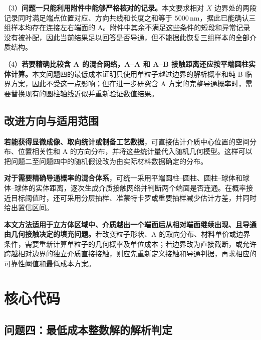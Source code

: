\documentclass[withoutpreface,bwprint]{cumcmthesis}
\begin{document}
（3）\textbf{问题一只能利用附件中能够严格核对的记录。}本文要求相对 $X$ 边界处的两段记录同时满足端点位置对应、方向共线和长度之和等于 $5000\,\mathrm{nm}$，据此已能确认三组样本均存在连接左右端面的 A。附件中其余不满足这些条件的短段和异常记录没有被补配，因此当前结果足以回答是否导通，但不能据此恢复三组样本的全部介质结构。

（4）\textbf{若要精确比较含 A 的混合网络，A--A 和 A--B 接触距离还应按平端圆柱实体计算。}本文问题四的最低成本证明只使用单粒子越过边界的解析概率和纯 B 临界方案，因此不受这一点影响；但在进一步研究含 A 方案的完整导通概率时，需要替换现有的圆柱轴线近似并重新验证数值结果。

\subsection{改进方向与适用范围}

\textbf{若能获得显微成像、取向统计或制备工艺数据}，可直接估计介质中心位置的空间分布、位置相关性和 A 的方向分布，并将这些统计量代入随机几何模型。这样可以把问题二至问题四中的随机假设改为由实际材料数据确定的分布。

\textbf{对于需要精确导通概率的混合体系}，可统一采用平端圆柱--圆柱、圆柱--球体和球体--球体的实体距离，逐次生成介质接触网络并判断两个端面是否连通。在概率接近目标阈值时，还可采用分层抽样、准蒙特卡罗或重要抽样减少估计方差，并同时给出置信区间。

\textbf{本文方法适用于立方体区域中、介质越出一个端面后从相对端面继续出现、且导通由几何接触决定的填充问题。}若改变粒子形状、A 的取向分布、材料单价或边界条件，需要重新计算单粒子的几何概率及单位成本；若边界改为直接截断，或允许跨越相对边界的独立介质直接接触，则应先重新定义接触和导通判据，再求相应的可靠性阈值和最低成本方案。




\appendix

\section{核心代码}
\label{app:core-code}

\subsection{问题四：最低成本整数解的解析判定}

\end{document}
